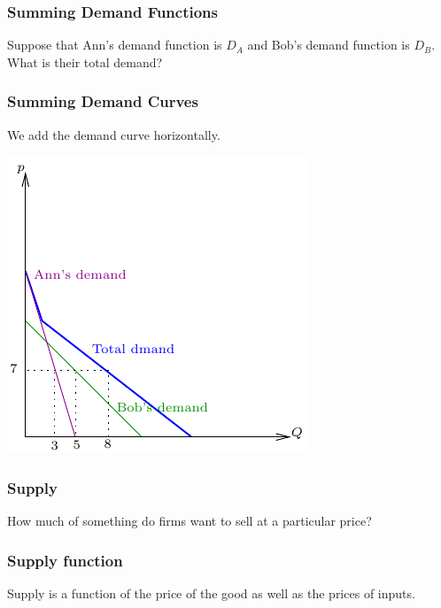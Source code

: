 \documentclass[xcolor=pdftex,dvipsnames]{beamer}
\begin{document}
\begin{frame}
\frametitle{Summing Demand Functions}
Suppose that Ann's demand function is $D_A$ and Bob's demand function is $D_B$. What is their total demand?

\end{frame}



\begin{frame}
\frametitle{Summing Demand Curves}
We add the demand curve horizontally.

\begin{center}\includegraphics{pics/DemandSum}
\end{center}
\end{frame}





\begin{frame}
\frametitle{Supply }
How much of something do firms want to sell at a particular price?\bigskip

\end{frame}




\begin{frame}
\frametitle{Supply function}
Supply is a function of the price of the good as well as the prices of inputs.\bigskip

\bigskip



\end{frame}
\end{document}
